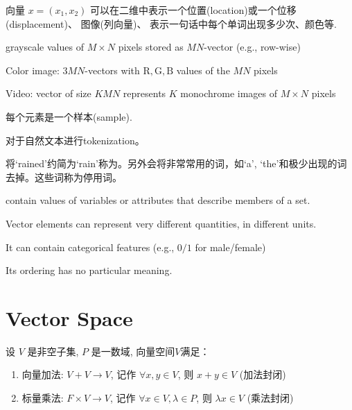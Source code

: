 向量 \( x=\left(x_{1}, x_{2}\right) \) 可以在二维中表示一个位置(location)或一个位移(displacement)、 图像(列向量)、 表示一句话中每个单词出现多少次、颜色等. 

\begin{example}
    grayscale values of $ M \times N $ pixels stored as $ M N $-vector (e.g., row-wise)

    Color image: $ 3 M N $-vectors with $ \mathrm{R}, \mathrm{G}, \mathrm{B} $ values of the $ M N $ pixels

    Video: vector of size $ K M N $ represents $ K $ monochrome images of $ M \times N $ pixels
\end{example}

\begin{example}[时间序列]
    每个元素是一个样本(sample).
\end{example}

\begin{example}[自然文本进行tokenization]
    对于自然文本进行tokenization。

    将`rained'约简为`rain'称为。另外会将非常常用的词，如`a', `the'和极少出现的词去掉。这些词称为停用词。
\end{example}

\begin{example}
    contain values of variables or attributes that describe members of a set.
\end{example}

\begin{remark}
    Vector elements can represent very different quantities, in different units.
\end{remark}

\begin{remark}
    It can contain categorical features (e.g., $0/1$ for male/female)
\end{remark}

\begin{remark}
    Its ordering has no particular meaning.
\end{remark}

\section{Vector Space}

\begin{definition}[向量空间$V$]
    设 \( V \) 是非空子集, \( P \) 是一数域, 向量空间$V$满足：

    \begin{enumerate}
        \item 向量加法: \( V+V \rightarrow V \), 记作 \( \forall x, y \in V \), 则 \( x+y \in V \) (加法封闭)
        \item 标量乘法: \( F \times V \rightarrow V \), 记作 \( \forall x \in V, \lambda \in P \), 则 \( \lambda x \in V \) (乘法封闭)
    \end{enumerate}


\end{definition}

